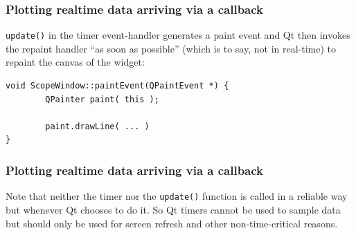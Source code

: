 \documentclass[xcolor=dvipsnames]{beamer}
\begin{document}
\begin{frame}[fragile]
\frametitle{Plotting realtime data arriving via a callback}
\texttt{update()} in the timer event-handler generates a
paint event and Qt then invokes the repaint
handler ``as soon as possible'' (which is to say, not in real-time) to repaint
the canvas of the widget:
\begin{verbatim}
void ScopeWindow::paintEvent(QPaintEvent *) {
        QPainter paint( this );

        paint.drawLine( ... )
}
\end{verbatim}
\end{frame}


\begin{frame}[fragile]
\frametitle{Plotting realtime data arriving via a callback}
Note that neither the timer nor the \texttt{update()} function
is called in a reliable way but whenever Qt chooses to do it.
So Qt timers cannot be used to sample data but should
only be used for screen refresh and other non-time-critical
reasons.
\end{frame}
\end{document}
